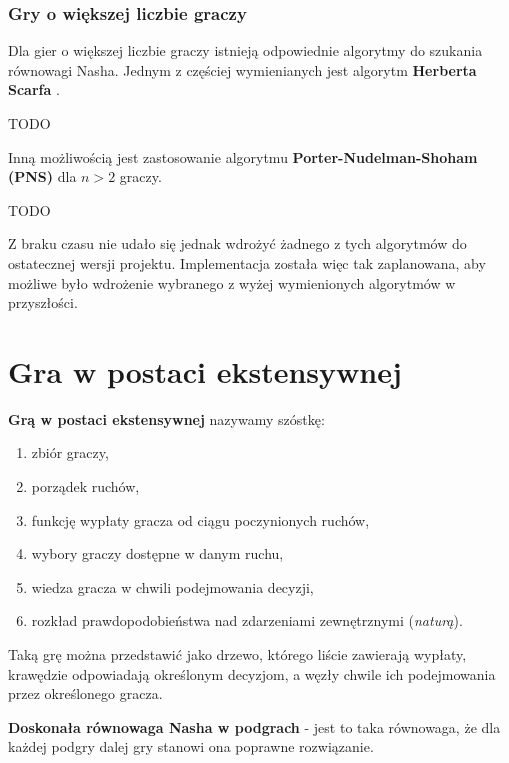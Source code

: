 \documentclass[polish]{standalone}
\begin{document}
\subsubsection{Gry o większej liczbie graczy}

Dla gier o większej liczbie graczy istnieją odpowiednie algorytmy do szukania równowagi Nasha. Jednym z częściej
wymienianych jest algorytm \textbf{Herberta Scarfa} \cite{SCARF-NR}.

TODO

Inną możliwością jest zastosowanie algorytmu \textbf{Porter-Nudelman-Shoham (PNS)} dla $n > 2$ graczy. \cite{PNS-NE}

TODO

Z braku czasu nie udało się jednak wdrożyć żadnego z tych algorytmów do ostatecznej wersji projektu. Implementacja
została więc tak zaplanowana, aby możliwe było wdrożenie wybranego z wyżej wymienionych algorytmów w przyszłości.

\section{Gra w postaci ekstensywnej}

\begin{definition}
\textbf{Grą w postaci ekstensywnej} nazywamy szóstkę:
\begin{enumerate}
\item zbiór graczy,
\item porządek ruchów,
\item funkcję wypłaty gracza od ciągu poczynionych ruchów,
\item wybory graczy dostępne w danym ruchu,
\item wiedza gracza w chwili podejmowania decyzji,
\item rozkład prawdopodobieństwa nad zdarzeniami zewnętrznymi (\textit{naturą}).
\end{enumerate}
\cite[str.~77--78]{FT-GT}
\end{definition}

Taką grę można przedstawić jako drzewo, którego liście zawierają wypłaty, krawędzie odpowiadają określonym decyzjom,
a węzły chwile ich podejmowania przez określonego gracza. 

\begin{definition}
\textbf{Doskonała równowaga Nasha w podgrach} - jest to taka równowaga, że dla każdej podgry dalej gry stanowi ona
poprawne rozwiązanie.
\end{definition}
\end{document}
